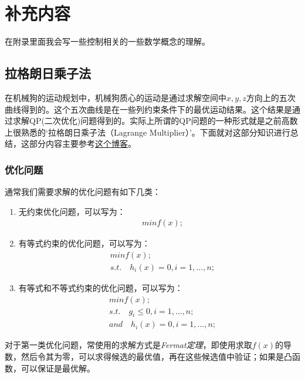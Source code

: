 







\chapter{补充内容}

在附录里面我会写一些控制相关的一些数学概念的理解。

\section{拉格朗日乘子法}

在机械狗的运动规划中，机械狗质心的运动是通过求解空间中$x, y, z$方向上的五次曲线得到的。这个五次曲线是在一些列约束条件下的最优运动结果。这个结果是通过求解QP(二次优化)问题得到的。实际上所谓的QP问题的一种形式就是之前高数上很熟悉的`拉格朗日乘子法（Lagrange Multiplier）'。下面就对这部分知识进行总结，这部分内容主要参考\href{https://juejin.cn/post/6956879956299218974}{这个博客}。




\subsection{优化问题}

通常我们需要求解的优化问题有如下几类：
\begin{enumerate}
  \item 无约束优化问题，可以写为：\begin{align*}
    &min f(x);
  \end{align*}
  \item 有等式约束的优化问题，可以写为：\begin{align*}
    &min f(x); \\ 
    &s.t. \quad h_i(x)=0, i = 1, \dots, n;
  \end{align*}
  \item 有等式和不等式约束的优化问题，可以写为：\begin{align*}
    &min f(x); \\
    &s.t. \quad g_i \leq 0, i = 1, \dots, n; \\
    &and \quad h_i(x)=0, i = 1, \dots, n;
  \end{align*}
\end{enumerate}

对于第一类优化问题，常使用的求解方式是\emph{Fermat定理}，即使用求取$f(x)$的导数，然后令其为零，可以求得候选的最优值，再在这些候选值中验证；如果是凸函数，可以保证是最优解。

